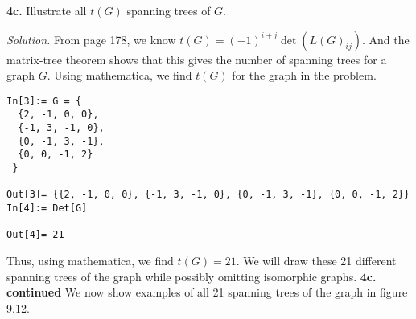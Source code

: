 \documentclass{article}
\begin{document}
\vspace{3mm}


\textbf{4c.} Illustrate all \(t(G)\) spanning trees of \(G\). 

\vspace{3mm}

\textit{Solution.} From page 178, we know \(t(G) = (-1)^{i+j} \det(L(G)_{ij}) \). And the matrix-tree theorem shows that this gives the number of spanning trees for a graph \(G\). Using mathematica, we find \(t(G)\) for the graph in the problem. 
\begin{verbatim}
In[3]:= G = {
  {2, -1, 0, 0},
  {-1, 3, -1, 0},
  {0, -1, 3, -1},
  {0, 0, -1, 2}
 }

Out[3]= {{2, -1, 0, 0}, {-1, 3, -1, 0}, {0, -1, 3, -1}, {0, 0, -1, 2}}
In[4]:= Det[G]

Out[4]= 21
\end{verbatim}
Thus, using mathematica, we find \(t(G)=21\). We will draw these 21 different spanning trees of the graph while possibly omitting isomorphic graphs. 
\newpage
\textbf{4c. continued} We now show examples of all 21 spanning trees of the graph in figure 9.12. 
\end{document}
